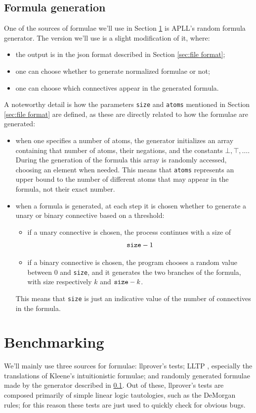 \subsection{Formula generation}\label{sec:formula generator}
One of the sources of formulae we'll use in Section \ref{sec:benchmarking} is APLL's random formula generator.
The version we'll use is a slight modification of it, where:
\begin{itemize}
	\item the output is in the json format described in Section \ref{sec:file format};
	\item one can choose whether to generate normalized formulae or not;
	\item one can choose which connectives appear in the generated formula.
\end{itemize}
A noteworthy detail is how the parameters \texttt{size} and \texttt{atoms} mentioned in Section \ref{sec:file format} are defined, as these are directly related to how the formulae are generated:
\begin{itemize}
	\item when one specifies a number of atoms, the generator initializes an array containing that number of atoms, their negations, and the constants $\bot, \top, \dots$.
		During the generation of the formula this array is randomly accessed, choosing an element when needed.
		This means that \texttt{atoms} represents an upper bound to the number of different atoms that may appear in the formula, not their exact number.
	\item when a formula is generated, at each step it is chosen whether to generate a unary or binary connective based on a threshold:
		\begin{itemize}
			\item if a unary connective is chosen, the process continues with a size of 
				$$\text{\texttt{size}} - 1$$
			\item if a binary connective is chosen, the program chooses a random value between 0 and \texttt{size}, and it generates the two branches of the formula, with size respectively $k$ and $\text{\texttt{size}} - k$.
		\end{itemize}
		This means that \texttt{size} is just an indicative value of the number of connectives in the formula.
\end{itemize}

\section{Benchmarking}\label{sec:benchmarking}
We'll mainly use three sources for formulae: llprover's tests; LLTP \cite{LLTP}, especially the translations of Kleene's intuitionistic formulae; and randomly generated formulae made by the generator described in \ref{sec:formula generator}.
Out of these, llprover's tests are composed primarily of simple linear logic tautologies, such as the DeMorgan rules; for this reason these tests are just used to quickly check for obvious bugs.

